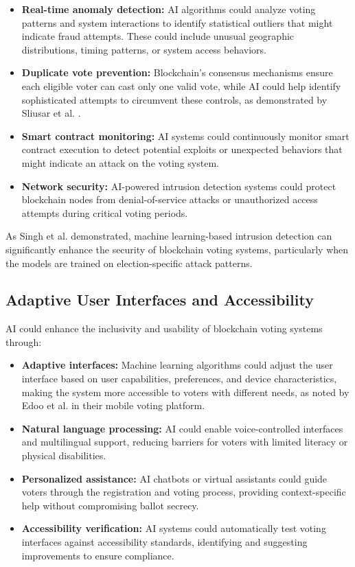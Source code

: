 \documentclass[conference]{IEEEtran}
\begin{document}
\begin{itemize}
    \item \textbf{Real-time anomaly detection:} AI algorithms could analyze voting patterns and system interactions to identify statistical outliers that might indicate fraud attempts. These could include unusual geographic distributions, timing patterns, or system access behaviors.
    
    \item \textbf{Duplicate vote prevention:} Blockchain's consensus mechanisms ensure each eligible voter can cast only one valid vote, while AI could help identify sophisticated attempts to circumvent these controls, as demonstrated by Sliusar et al. \cite{b6}.
    
    \item \textbf{Smart contract monitoring:} AI systems could continuously monitor smart contract execution to detect potential exploits or unexpected behaviors that might indicate an attack on the voting system.
    
    \item \textbf{Network security:} AI-powered intrusion detection systems could protect blockchain nodes from denial-of-service attacks or unauthorized access attempts during critical voting periods.
\end{itemize}

As Singh et al. \cite{b7} demonstrated, machine learning-based intrusion detection can significantly enhance the security of blockchain voting systems, particularly when the models are trained on election-specific attack patterns.

\subsection{Adaptive User Interfaces and Accessibility}
AI could enhance the inclusivity and usability of blockchain voting systems through:

\begin{itemize}
    \item \textbf{Adaptive interfaces:} Machine learning algorithms could adjust the user interface based on user capabilities, preferences, and device characteristics, making the system more accessible to voters with different needs, as noted by Edoo et al. \cite{b9} in their mobile voting platform.
    
    \item \textbf{Natural language processing:} AI could enable voice-controlled interfaces and multilingual support, reducing barriers for voters with limited literacy or physical disabilities.
    
    \item \textbf{Personalized assistance:} AI chatbots or virtual assistants could guide voters through the registration and voting process, providing context-specific help without compromising ballot secrecy.
    
    \item \textbf{Accessibility verification:} AI systems could automatically test voting interfaces against accessibility standards, identifying and suggesting improvements to ensure compliance.
\end{itemize}
\end{document}
